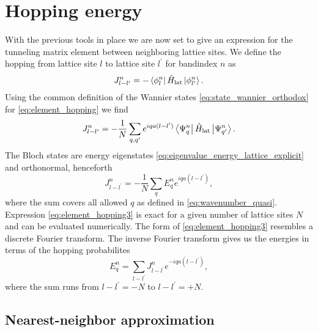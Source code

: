 \section{Hopping energy}

With the previous tools in place we are now set to give an expression for the
tunneling matrix element between neighboring lattice sites. We define the
hopping from lattice site $l$ to lattice site $l^\prime$ for bandindex $n$ as
\begin{equation}
  J^n_{l-l^\prime}
  =-\bra{\phi^n_l}\hat{H}_\text{lat}\ket{\phi^n_{l^\prime}}
  \label{eq:element_hopping}.
\end{equation}
Using the common definition of the Wannier states
\cref{eq:state_wannier_orthodox} for \cref{eq:element_hopping} we find
\begin{equation}
  J^n_{l-l^\prime}
  =-\frac{1}{N}\sum_{q,q^\prime}e^{iqa(l-l^\prime)}
  \bra{\Psi^n_q}\hat{H}_\text{lat}\ket{\Psi^n_{q^\prime}}
  \label{eq:element_hopping2}.
\end{equation}
The Bloch states are energy eigenstates
\cref{eq:eigenvalue_energy_lattice_explicit} and orthonormal, henceforth
\begin{equation}
  J^n_{l-l^\prime}
  =-\frac{1}{N}\sum_{q}E^n_qe^{iqa(l-l^\prime)}
  \label{eq:element_hopping3},
\end{equation}
where the sum covers all allowed $q$ as defined in \cref{eq:wavenumber_quasi}.
Expression \cref{eq:element_hopping3} is exact for a given number of lattice
sites $N$ and can be evaluated numerically. The form of
\cref{eq:element_hopping3} resembles a discrete Fourier transform. The
inverse Fourier transform gives us the energies in terms of the hopping
probabilites
\begin{equation}
  E^n_q
  =\sum_{l-l^\prime}J^n_{l-l^\prime}e^{-iqa(l-l^\prime)}
  \label{eq:element_energy_hopping},
\end{equation}
where the sum runs from $l-l^\prime=-N$ to $l-l^\prime=+N$.

\subsection{Nearest-neighbor approximation}

